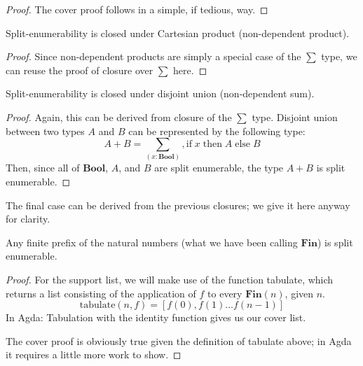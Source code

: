 \begin{refsection}
\begin{proof}
  The cover proof follows in a simple, if tedious, way.
\end{proof}
\begin{lemma}
  Split-enumerability is closed under Cartesian product (non-dependent product).
\end{lemma} 
\begin{proof}
  Since non-dependent products are simply a special case of the \(\sum\) type,
  we can reuse the proof of closure over \(\sum\) here.
\end{proof}
\begin{lemma}
  Split-enumerability is closed under disjoint union (non-dependent sum).
\end{lemma}
\begin{proof}
  Again, this can be derived from closure of the \(\sum\) type.
  Disjoint union between two types \(A\) and \(B\) can be represented by the
  following type:
  \begin{equation}
    A + B = \sum_{(x : \mathbf{Bool})} , \text{if} \; x \; \text{then} \; A \; \text{else} \; B
  \end{equation}
  Then, since all of \(\mathbf{Bool}\), \(A\), and \(B\) are split enumerable,
  the type \(A + B\) is split enumerable.
\end{proof}
The final case can be derived from the previous closures; we give it here anyway
for clarity.
\begin{lemma} \label{fin-split-enum}
  Any finite prefix of the natural numbers (what we have been calling
  \(\textbf{Fin}\)) is split enumerable.
\end{lemma}
\begin{proof}
  For the support list, we will make use of the function tabulate, which returns
  a list consisting of the application of \(f\) to every \(\textbf{Fin}(n)\),
  given \(n\).
  \begin{equation}
    \text{tabulate}(n , f) = \left[ f(0) , f(1) \dots f(n - 1) \right]
  \end{equation}
  In Agda:
  Tabulation with the identity function gives us our cover list.

  The cover proof is obviously true given the definition of tabulate above; in
  Agda it requires a little more work to show.
\end{proof}

\end{refsection}
